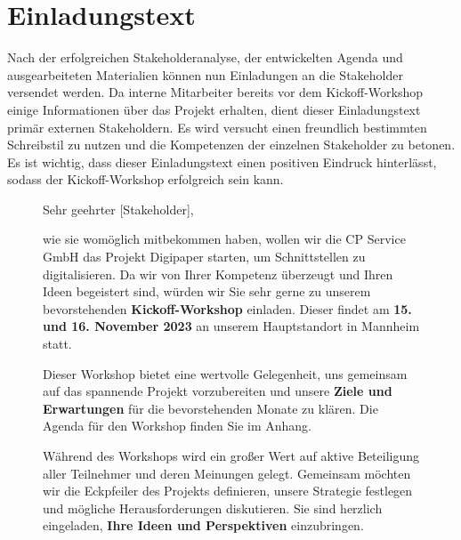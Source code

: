 \section{Einladungstext}
Nach der erfolgreichen Stakeholderanalyse, der entwickelten Agenda und ausgearbeiteten Materialien können nun Einladungen an die Stakeholder versendet werden. Da interne Mitarbeiter bereits vor dem Kickoff-Workshop einige Informationen über das Projekt erhalten, dient dieser Einladungstext primär externen Stakeholdern. Es wird versucht einen freundlich bestimmten Schreibstil zu nutzen und die Kompetenzen der einzelnen Stakeholder zu betonen. Es ist wichtig, dass dieser Einladungstext einen positiven Eindruck hinterlässt, sodass der Kickoff-Workshop erfolgreich sein kann. 

\begin{figure}[ht]
	\centering
	\begin{minipage}{\textwidth}		
		\noindent Sehr geehrter [Stakeholder],
		
		\vspace*{1.5\baselineskip}
		
		\noindent wie sie womöglich mitbekommen haben, wollen wir die CP Service GmbH das Projekt Digipaper starten, um Schnittstellen zu digitalisieren. Da wir von Ihrer Kompetenz überzeugt und Ihren Ideen begeistert sind, würden wir Sie sehr gerne zu unserem bevorstehenden \textbf{Kickoff-Workshop} einladen. Dieser findet am \textbf{15. und 16. November 2023} an unserem Hauptstandort in Mannheim statt. 
		
		\vspace*{0.5\baselineskip}
		
		\noindent Dieser Workshop bietet eine wertvolle Gelegenheit, uns gemeinsam auf das spannende Projekt vorzubereiten und unsere \textbf{Ziele und Erwartungen} für die bevorstehenden Monate zu klären. Die Agenda für den Workshop finden Sie im Anhang. 
		
		\vspace*{0.5\baselineskip}
		
		\noindent Während des Workshops wird ein großer Wert auf aktive Beteiligung aller Teilnehmer und deren Meinungen gelegt. Gemeinsam möchten wir die Eckpfeiler des Projekts definieren, unsere Strategie festlegen und mögliche Herausforderungen diskutieren. Sie sind herzlich eingeladen, \textbf{Ihre Ideen und Perspektiven} einzubringen.
		
		\vspace*{0.5\baselineskip}
		

\end{minipage}
\end{figure}
